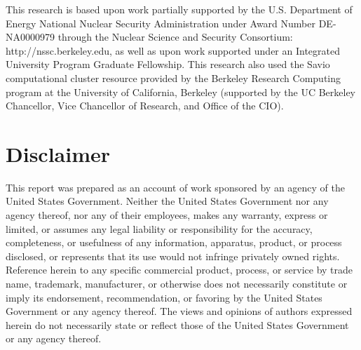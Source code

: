 \documentclass[twoside,a4paper]{refart}
\begin{document}
This research is based upon work partially supported by the U.S. Department of Energy National Nuclear Security Administration under Award Number DE-NA0000979 through the Nuclear Science and Security Consortium: http://nssc.berkeley.edu, as well as upon work supported under an Integrated University Program Graduate Fellowship.  This research also used the Savio computational cluster resource provided by the Berkeley Research Computing program at the University of California, Berkeley (supported by the UC Berkeley Chancellor, Vice Chancellor of Research, and Office of the CIO).

\section*{Disclaimer}
\label{sec:disclaim}

This report was prepared as an account of work sponsored by an agency of the United States Government. Neither the United States Government nor any agency thereof, nor any of their employees, makes any warranty, express or limited, or assumes any legal liability or responsibility for the accuracy, completeness, or usefulness of any information, apparatus, product, or process disclosed, or represents that its use would not infringe privately owned rights. Reference herein to any specific commercial product, process, or service by trade name, trademark, manufacturer, or otherwise does not necessarily constitute or imply its endorsement, recommendation, or favoring by the United States Government or any agency thereof. The views and opinions of authors expressed herein do not necessarily state or reflect those of the United States Government or any agency thereof.

\printindex
\end{document}
